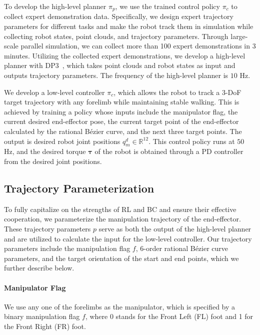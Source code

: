 To develop the high-level planner $\pi_{p}$, we use the trained control policy $\pi_{c}$ to collect expert demonstration data. Specifically, we design expert trajectory parameters for different tasks and make the robot track them in simulation while collecting robot states, point clouds, and trajectory parameters. Through large-scale parallel simulation, we can collect more than 100 expert demonstrations in 3 minutes. Utilizing the collected expert demonstrations, we develop a high-level planner with DP3~\cite{ze2024DP3}, which takes point clouds and robot states as input and outputs trajectory parameters. The frequency of the high-level planner is $10$ Hz.

We develop a low-level controller $\pi_{c}$, which allows the robot to track a 3-DoF target trajectory with any forelimb while maintaining stable walking. This is achieved by training a policy whose inputs include the manipulator flag, the current desired end-effector pose, the current target point of the end-effector calculated by the rational Bézier curve, and the next three target points. The output is desired robot joint positions $q^{d}_{m} \in \mathbb{R}^{12}$. This control policy runs at $50$ Hz, and the desired torque $\mathbf{\tau}$ of the robot is obtained through a PD controller from the desired joint positions.



\subsection{Trajectory Parameterization}
To fully capitalize on the strengths of RL and BC and ensure their effective cooperation, we parameterize the manipulation trajectory of the end-effector. 
These trajectory parameters $p$ serve as both the output of the high-level planner and are utilized to calculate the input for the low-level controller.
Our trajectory parameters include the manipulation flag $f$, 6-order rational Bézier curve parameters, and the target orientation of the start and end points, which we further describe below.

\paragraph{Manipulator Flag} We use any one of the forelimbs as the manipulator, which is specified by a binary manipulation flag $f$, where 0 stands for the Front Left (FL) foot and 1 for the Front Right (FR) foot.

